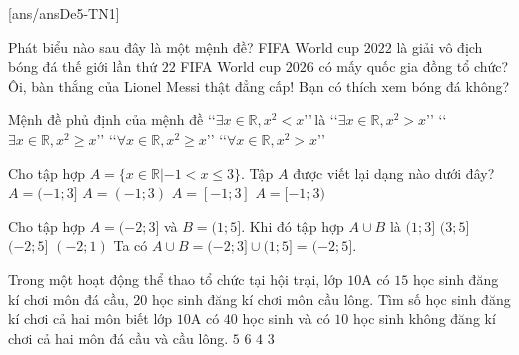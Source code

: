 ﻿\begin{name}
	{\tenchude}
	{\tendethi}
	{\tentruong}
	{\thoigian}
\end{name}
\TN
\setcounter{ex}{0}\setcounter{bt}{0}
[ans/ansDe5-TN1]
\begin{ex}%
Phát biểu nào sau đây là một mệnh đề?
\choice
{\True FIFA World cup $2022$ là giải vô địch bóng đá thế giới lần thứ $22$}
{FIFA World cup $2026$ có mấy quốc gia đồng tổ chức?}
{Ôi, bàn thắng của Lionel Messi thật đẳng cấp!}
{Bạn có thích xem bóng đá không?}
\loigiai{
}
\end{ex}

\begin{ex}%
Mệnh đề phủ định của mệnh đề \lq\lq$\exists x \in \mathbb{R}, x^2<x$\rq\rq\,là
\choice
{\lq\lq$\exists x \in \mathbb{R}, x^2>x$\rq\rq}
{\lq\lq$\exists x \in \mathbb{R}, x^2 \geq x$\rq\rq}
{\True \lq\lq$\forall x \in \mathbb{R}, x^2 \geq x$\rq\rq}
{\lq\lq$\forall x \in \mathbb{R}, x^2>x$\rq\rq}
\end{ex}

\begin{ex}%
Cho tập hợp $A=\{x\in \mathbb{R}|-1<x\le 3\}$. Tập $A$ được viết lại dạng nào dưới đây?
\choice
{\True $A=(-1;3]$}
{$A=(-1;3)$}
{$A=[-1;3]$}
{$A=[-1;3)$}
\loigiai{
Tập $A$ được viết lại là	$A=(-1;3]$.
}
\end{ex}

\begin{ex}%
Cho tập hợp $A=(-2; 3]$ và $B=(1; 5]$. Khi đó tập hợp $A \cup B$ là
\choice
{$(1; 3]$}
{$(3; 5]$}
{\True $(-2; 5]$}
{$(-2; 1)$}
\loigiai
{Ta có $A \cup B = (-2;3] \cup (1;5] = (-2;5]$.}
\end{ex}

\begin{ex}%
Trong một hoạt động thể thao tổ chức tại hội trại, lớp $10$A có $15$ học sinh đăng kí chơi môn đá cầu, $20$ học sinh đăng kí chơi môn cầu lông. Tìm số học sinh đăng kí chơi cả hai môn biết lớp $10$A có $40$ học sinh và có $10$ học sinh không đăng kí chơi cả hai môn đá cầu và cầu lông.
\choice
{\True $5$}
{$6$}
{$4$}
{$3$}
\end{ex}

